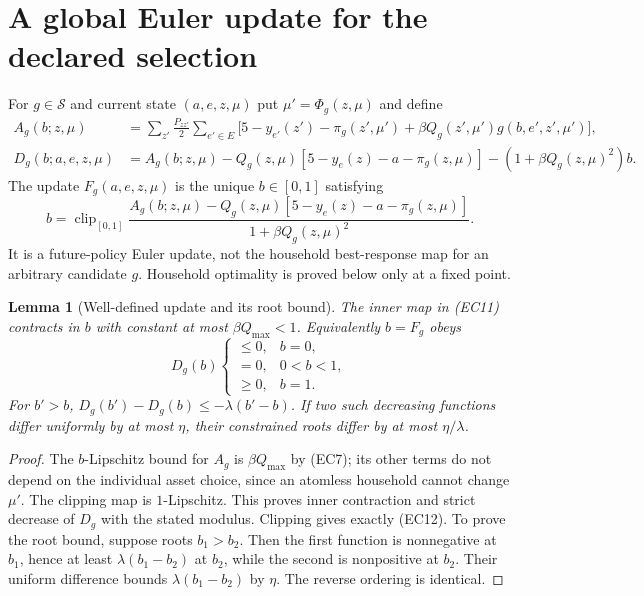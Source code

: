 \documentclass[11pt,a4paper]{article}
\newtheorem{lemma}[theorem]{Lemma}
\begin{document}
\section{A global Euler update for the declared selection}
\label{sec:euler-update}
For $g\in\mathcal S$ and current state $(a,e,z,\mu)$ put
$\mu'=\Phi_g(z,\mu)$ and define
\begin{align*}
 A_g(b;z,\mu)
 &=\sum_{z'}\frac{P_{zz'}}2\sum_{e'\in E}
 \bigl[5-y_{e'}(z')-\pi_g(z',\mu')
       +\beta Q_g(z',\mu')g(b,e',z',\mu')\bigr],\\
 D_g(b;a,e,z,\mu)
 &=A_g(b;z,\mu)-Q_g(z,\mu)
       [5-y_e(z)-a-\pi_g(z,\mu)]
       -(1+\beta Q_g(z,\mu)^2)b.
 \tag{EC10}
\end{align*}
The update $F_g(a,e,z,\mu)$ is the unique $b\in[0,1]$ satisfying
\[
 b=\operatorname{clip}_{[0,1]}
 \frac{A_g(b;z,\mu)-Q_g(z,\mu)[5-y_e(z)-a-\pi_g(z,\mu)]}
      {1+\beta Q_g(z,\mu)^2}.
 \tag{EC11}
\]
It is a future-policy Euler update, not the household best-response map
for an arbitrary candidate $g$. Household optimality is proved below only
at a fixed point.

\begin{lemma}[Well-defined update and its root bound]\label{lem:euler-root}
The inner map in \textup{(EC11)} contracts in $b$ with constant at most
$\beta Q_{\max}<1$. Equivalently $b=F_g$ obeys
\[
 D_g(b)\begin{cases}\leq0,&b=0,\\=0,&0<b<1,\\\geq0,&b=1.\end{cases}
 \tag{EC12}
\]
For $b'>b$, $D_g(b')-D_g(b)\leq-\lambda(b'-b)$.
If two such decreasing functions differ uniformly by at most $\eta$,
their constrained roots differ by at most $\eta/\lambda$.
\end{lemma}
\begin{proof}
The $b$-Lipschitz bound for $A_g$ is $\beta Q_{\max}$ by
\textup{(EC7)}; its other terms do not depend on the individual asset
choice, since an atomless household cannot change $\mu'$. The clipping
map is $1$-Lipschitz. This proves inner contraction and strict decrease
of $D_g$ with the stated modulus. Clipping gives exactly
\textup{(EC12)}. To prove the root bound, suppose roots $b_1>b_2$.
Then the first function is nonnegative at $b_1$, hence at least
$\lambda(b_1-b_2)$ at $b_2$, while the second is nonpositive at $b_2$.
Their uniform difference bounds $\lambda(b_1-b_2)$ by $\eta$.
The reverse ordering is identical.
\end{proof}
\end{document}
